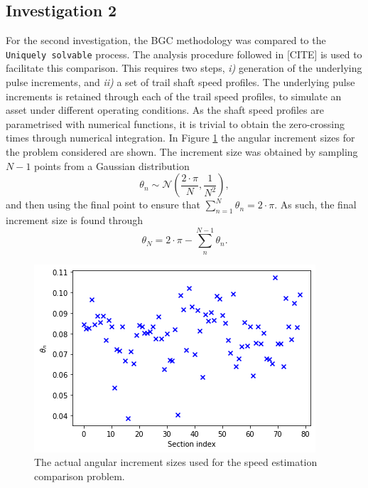 \documentclass{article}
\begin{document}
	\subsection{Investigation 2}
	
	For the second investigation, the BGC methodology was compared to the \texttt{Uniquely solvable} process. The analysis procedure followed in [CITE] is used to facilitate this comparison. This requires two steps, \emph{i)} generation of the underlying pulse increments, and \emph{ii)} a set of trail shaft speed profiles. The underlying pulse increments is retained through each of the trail speed profiles, to simulate an asset under different operating conditions. As the shaft speed profiles are parametrised with numerical functions, it is trivial to obtain the zero-crossing times through numerical integration. In Figure \ref{fig:Q4_increments} the angular increment sizes for the problem considered are shown. The increment size was obtained by sampling $N-1$ points from a Gaussian distribution 
	\begin{equation}
		\theta_n \sim \mathcal{N}(\frac{2\cdot\pi}{N}, \frac{1}{N^2}),
	\end{equation} 
	and then using the final point to ensure that $\sum_{n=1}^{N}\theta_n = 2\cdot \pi$. As such, the final increment size is found through 
	\begin{equation}
		\theta_N = 2\cdot \pi - \sum_{n}^{N-1}\theta_n.
	\end{equation}
	\begin{figure}[htb!]
		\centering
		\includegraphics[scale=0.6]{Q4_2.png}
		\caption{The actual angular increment sizes used for the speed estimation comparison problem.}
		\label{fig:Q4_increments}
	\end{figure}
\end{document}
